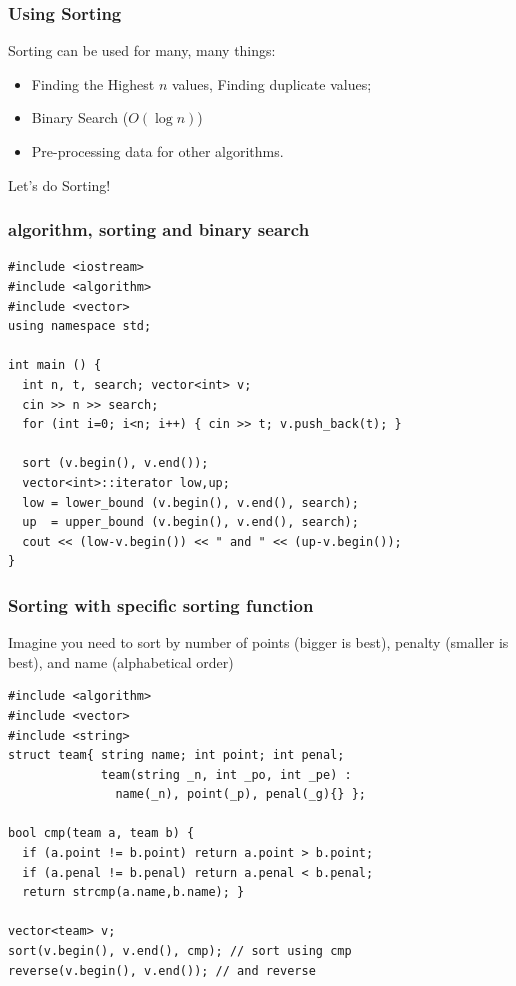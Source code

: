 \documentclass{beamer}
\begin{document}
\begin{frame}
  \frametitle{Using Sorting}
  Sorting can be used for \alert{many, many} things:

  \bigskip

    \begin{itemize}
    \item Finding the Highest $n$ values, Finding duplicate values;
      \bigskip

    \item Binary Search ($O(\log n)$)
      \bigskip

    \item Pre-processing data for other algorithms.
    \end{itemize}

  \bigskip
  Let's do Sorting!
\end{frame}

\begin{frame}[fragile]
  \frametitle{algorithm, sorting and binary search}
{\small
\begin{block}{}
\begin{verbatim}
#include <iostream>
#include <algorithm>
#include <vector>
using namespace std;

int main () {
  int n, t, search; vector<int> v;
  cin >> n >> search;
  for (int i=0; i<n; i++) { cin >> t; v.push_back(t); }

  sort (v.begin(), v.end());
  vector<int>::iterator low,up;
  low = lower_bound (v.begin(), v.end(), search);
  up  = upper_bound (v.begin(), v.end(), search);
  cout << (low-v.begin()) << " and " << (up-v.begin());
}
\end{verbatim}
\end{block}}
\end{frame}


\begin{frame}[fragile]
  \frametitle{Sorting with specific sorting function}
{\small
  Imagine you need to sort by number of points (bigger is best),
  penalty (smaller is best), and name (alphabetical order)

  \begin{block}{}
\begin{verbatim}
#include <algorithm>
#include <vector>
#include <string>
struct team{ string name; int point; int penal;
             team(string _n, int _po, int _pe) :
               name(_n), point(_p), penal(_g){} };

bool cmp(team a, team b) {
  if (a.point != b.point) return a.point > b.point;
  if (a.penal != b.penal) return a.penal < b.penal;
  return strcmp(a.name,b.name); }

vector<team> v;
sort(v.begin(), v.end(), cmp); // sort using cmp
reverse(v.begin(), v.end()); // and reverse
\end{verbatim}
\end{block}}
\end{frame}
\end{document}
